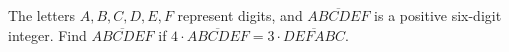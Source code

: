 The letters $A,B,C,D,E,F$ represent digits, and $\overline{ABCDEF}$ is a positive six-digit integer. Find $\overline{ABCDEF}$ if $4\cdot\overline{ABCDEF}=3\cdot\overline{DEFABC}$.
